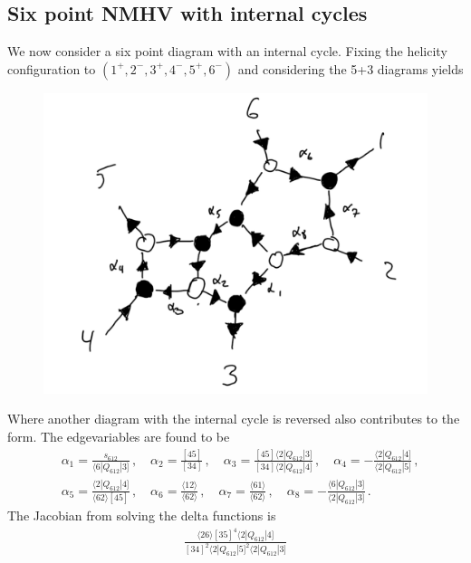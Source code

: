 \documentclass[letter,11pt]{article}
\newcommand{\ab}[1]{\langle #1 \rangle}
\newcommand{\sqb}[1]{[ #1 ]}
\newcommand{\aMs}[3]{\langle #1|#2|#3]}  		%
\newcommand{\sab}[1]{s_{#1}}
\begin{document}
\subsection{Six point NMHV with internal cycles}
We now consider a six point diagram with an internal cycle. Fixing the helicity configuration to $(1^+,2^-,3^+,4^-,5^+,6^-)$ and considering the 5+3 diagrams yields 
\begin{figure}[H]
	\centering
	\includegraphics[width=0.5\linewidth]{3+5L}
	\caption{}
	\label{fig:5pt3l}
\end{figure}
Where another diagram with the internal cycle is reversed also contributes to the form. The edgevariables are found to be
\begin{equation}
	\begin{aligned}
		& \alpha_1 = \frac{\sab{612}}{\aMs{6}{Q_{612}}{3}}\,, \quad \alpha_2 = \frac{[45]}{[34]}\,, \quad \alpha_3 = \frac{[45]\aMs{2}{Q_{612}}{3}}{[34]\aMs{2}{Q_{612}}{4}}\,, \quad \alpha_4 = -\frac{\aMs{2}{Q_{612}}{4}}{\aMs{2}{Q_{612}}{5}}\,,\\ 
		&\alpha_5 = \frac{\aMs{2}{Q_{612}}{4}}{\ab{62}[45]}\,, 
		\quad
		\alpha_6 = \frac{\ab{12}}{\ab{62}}\,,\quad \alpha_7 = \frac{\ab{61}}{\ab{62}}\,,\quad
		\alpha_8 = - \frac{\aMs{6}{Q_{612}}{3}}{\aMs{2}{Q_{612}}{3}}\,.
	\end{aligned}
\end{equation}
The Jacobian from solving the delta functions is
\begin{equation}
	\begin{aligned}
		\frac{\ab{26}\sqb{35}^4\aMs{2}{Q_{612}}{4}}{\sqb{34}^2\aMs{2}{Q_{612}}{5}^2\aMs{2}{Q_{612}}{3}}
	\end{aligned}
\end{equation}
\end{document}
